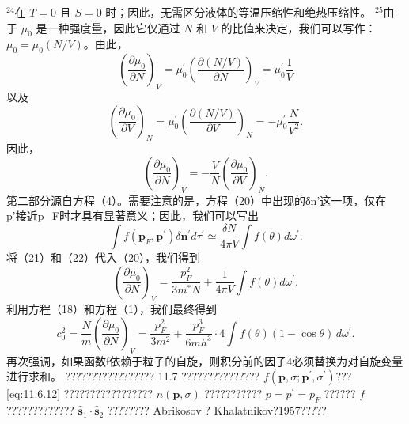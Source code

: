 \(^{24}\)在 \(T=0\) 且 \(S=0\) 时；因此，无需区分液体的等温压缩性和绝热压缩性。
\(^{25}\)由于 \(\mu_{0}\) 是一种强度量，因此它仅通过 \(N\) 和 \(V\) 的比值来决定，我们可以写作：\(\mu_{0}=\mu_{0}(N/V)\)。由此，
\begin{equation}\tag{11.6.68}\label{eq:11.6.68}
\left( \frac { \partial \mu _ { 0 } } { \partial N } \right) _ { V } = \mu _ { 0 } ^{\prime} \left( \frac { \partial ( N / V ) } { \partial N } \right) _ { V } = \mu _ { 0 } ^{\prime} \frac { 1 } { V }
\end{equation}
以及
\begin{equation}\tag{11.6.69}\label{eq:11.6.69}
\left( \frac { \partial \mu _ { 0 } } { \partial V } \right) _ { N } = \mu _ { 0 } ^{\prime} \left( \frac { \partial ( N / V ) } { \partial V } \right) _ { N } = - \mu _ { 0 } ^{\prime} \frac { N } { V ^{2} } .
\end{equation}
因此，
\begin{equation}\tag{11.6.70}\label{eq:11.6.70}
\left( \frac { \partial \mu _ { 0 } } { \partial N } \right) _ { V } = - \frac { V } { N } \left( \frac { \partial \mu _ { 0 } } { \partial V } \right) _ { N } .
\end{equation}
第二部分源自方程（4）。需要注意的是，方程（20）中出现的δn'这一项，仅在p'接近p\_F时才具有显著意义；因此，我们可以写出
\begin{equation}\tag{11.6.71}\label{eq:11.6.71}
\int f ( \pmb { p } _ { F } , \pmb { p } ^{\prime} ) \delta \pmb { n } ^{\prime} d \tau ^{\prime} \simeq \frac { \delta N } { 4 \pi V } \int f ( \theta ) d \omega ^{\prime} .
\end{equation}
将（21）和（22）代入（20），我们得到
\begin{equation}\tag{11.6.72}\label{eq:11.6.72}
\left( \frac { \partial \mu _ { 0 } } { \partial N } \right) _ { V } = \frac { p _ { F } ^{2} } { 3 m ^{*} N } + \frac { 1 } { 4 \pi V } \int f ( \theta ) d \omega ^{\prime} .
\end{equation}
利用方程（18）和方程（1），我们最终得到
\begin{equation}\tag{11.6.73}\label{eq:11.6.73}
c _ { 0 } ^{2} = \frac { N } { m } \left( \frac { \partial \mu _ { 0 } } { \partial N } \right) _ { V } = \frac { p _ { F } ^{2} } { 3 m ^{2} } + \frac { p _ { F } ^{3} } { 6 m h ^{3} } \cdot 4 \int f ( \theta ) ( 1 - \cos \theta ) \, d \omega ^{\prime} .
\end{equation}
再次强调，如果函数f依赖于粒子的自旋，则积分前的因子4必须替换为对自旋变量进行求和。
????????????????? 11.7 ??????????????? \(f(\boldsymbol{p},\sigma;\boldsymbol{p}^{\prime},\sigma^{\prime})\)??? \autoref{eq:11.6.12} ????????????????? \(n(\boldsymbol{p},\sigma)\) ??????????? \(p=p^{\prime}=p_F\) ?????? \(f\) ????????????? \(\hat{\mathbf{s}}_1\cdot\hat{\mathbf{s}}_2\) ???????? Abrikosov ? Khalatnikov?1957?????
